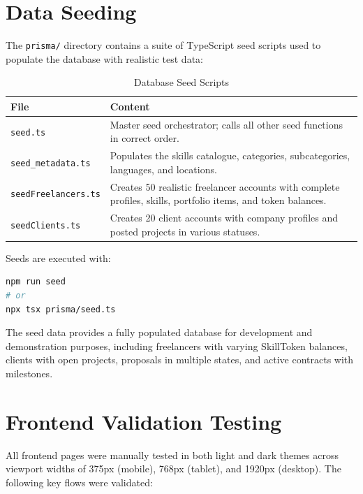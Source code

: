 \section{Data Seeding}

The \texttt{prisma/} directory contains a suite of TypeScript seed scripts used to populate the database with realistic test data:

\begin{table}[H]
\centering
\caption{Database Seed Scripts}
\begin{tabularx}{\textwidth}{lX}
\toprule
\textbf{File} & \textbf{Content} \\
\midrule
\texttt{seed.ts}            & Master seed orchestrator; calls all other seed functions in correct order. \\
\texttt{seed\_metadata.ts}  & Populates the skills catalogue, categories, subcategories, languages, and locations. \\
\texttt{seedFreelancers.ts} & Creates 50 realistic freelancer accounts with complete profiles, skills, portfolio items, and token balances. \\
\texttt{seedClients.ts}     & Creates 20 client accounts with company profiles and posted projects in various statuses. \\
\end{tabularx}
\end{table}

Seeds are executed with:

\begin{lstlisting}[language=bash, caption={Running the Database Seed}]
npm run seed
# or
npx tsx prisma/seed.ts
\end{lstlisting}

The seed data provides a fully populated database for development and demonstration purposes, including freelancers with varying SkillToken balances, clients with open projects, proposals in multiple states, and active contracts with milestones.

\section{Frontend Validation Testing}

All frontend pages were manually tested in both light and dark themes across viewport widths of 375px (mobile), 768px (tablet), and 1920px (desktop). The following key flows were validated:

